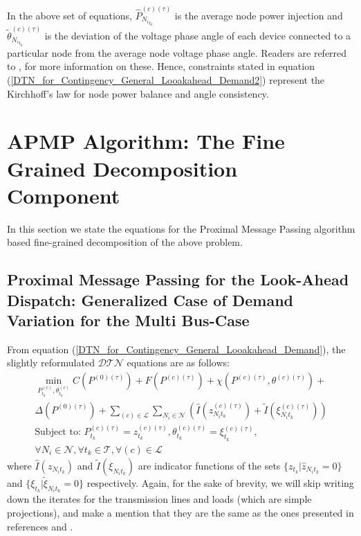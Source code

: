 \documentclass[preprint,12pt,3p]{elsarticle}
\begin{document}
	In the above set of equations, $\hat{P}_{{N_i}_{t_k}}^{(c)(\tau)}$ is the average node power injection and $\tilde{\theta}_{{N_i}_{t_k}}^{(c)(\tau)}$ is the deviation of the voltage phase angle of each device connected to a particular node from the average node voltage phase angle. Readers are referred to \cite{CK:14}, \cite{KC:13} for more information on these. Hence, constraints stated in equation (\ref{DTN_for_Contingency_General_Looakahead_Demand2}) represent the Kirchhoff's law for node power balance and angle consistency.
	\section{APMP Algorithm: The Fine Grained Decomposition Component}
	\label{PMPAlgorithm}
	In this section we state the equations for the Proximal Message Passing algorithm based fine-grained decomposition of the above problem.
	\subsection{Proximal Message Passing for the Look-Ahead Dispatch: Generalized Case of Demand Variation for the Multi Bus-Case}
	From equation (\ref{DTN_for_Contingency_General_Looakahead_Demand}), the slightly reformulated $\mathcal{DTN}$ equations are as follows:
	\begin{equation}\label{DTN_Reform_Demand_Var_General}
	\begin{array}{ll}
	\min_{P_{t_k}^{(c)},\theta_{t_k}^{(c)}}C(P^{(0)(\tau)})
	+F(P^{(c)(\tau)})+\chi(P^{(c)(\tau)},\theta^{(c)(\tau)})+\\\Delta(P^{(0)(\tau)})+\sum_{(c)\in\mathcal{L}}\sum_{{N_i}\in\mathcal{N}}(\hat{I}(z_{{N_i}{t_k}}^{(c)(\tau)})+\tilde{I}(\xi_{{N_i}{t_k}}^{(c)(\tau)}))\\
	\text{Subject to: }P_{t_k}^{(c)(\tau)}=z_{t_k}^{(c)(\tau)}, {\theta}_{t_k}^{(c)(\tau)}=\xi_{t_k}^{(c)(\tau)},\\ \forall N_i\in\mathcal{N}, \forall t_k\in\mathcal{T},
	\forall (c)\in\mathcal{L}
	\end{array}
	\end{equation}
	where $\hat{I}(z_{{N_i}{t_k}})$ and $\tilde{I}(\xi_{{N_i}{t_k}})$ are indicator functions of the sets $\{z_{t_k}|\hat{z}_{{N_i}{t_k}}=0\}$ and $\{\xi_{t_k}|\tilde{\xi}_{{N_i}{t_k}}=0\}$ respectively. Again, for the sake of brevity, we will skip writing down the iterates for the transmission lines and loads (which are simple projections), and make a mention that they are the same as the ones presented in references \cite{CK:14} and \cite{Sambuddha2017}.
\end{document}
